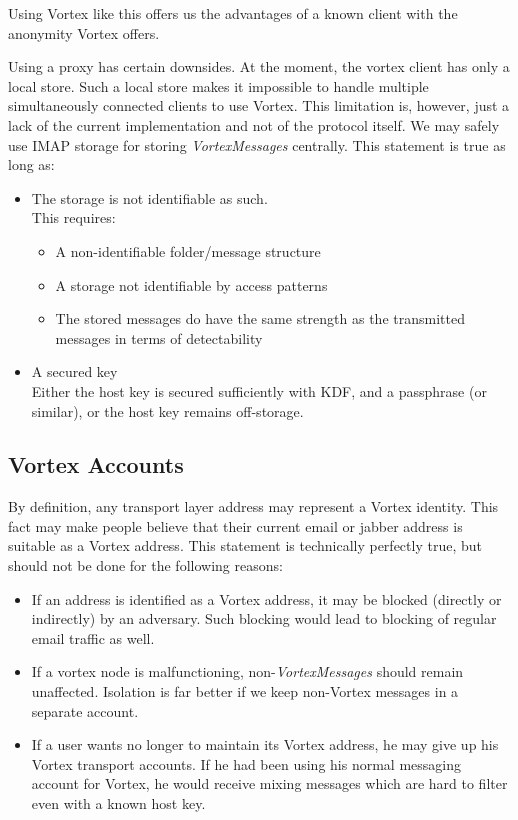 Using Vortex like this offers us the advantages of a known client with the anonymity Vortex offers.

Using a proxy has certain downsides. At the moment, the vortex client has only a local store. Such a local store makes it impossible to handle multiple simultaneously connected clients to use Vortex. This limitation is, however, just a lack of the current implementation and not of the protocol itself. We may safely use IMAP storage for storing \emph{VortexMessages} centrally. This statement is true as long as:
\begin{itemize}
	\item The storage is not identifiable as such.\\
	This requires:
	\begin{itemize}
		\item A non-identifiable folder/message structure
		\item A storage not identifiable by access patterns
		\item The stored messages do have the same strength as the transmitted messages in terms of detectability
	\end{itemize}
	\item A secured key\\
	Either the host key is secured sufficiently with KDF, and a passphrase (or similar), or the host key remains off-storage.
\end{itemize}

\subsection{Vortex Accounts}
By definition, any transport layer address may represent a Vortex identity. This fact may make people believe that their current email or jabber address is suitable as a Vortex address. This statement is technically perfectly true, but should not be done for the following reasons:
\begin{itemize}
	\item If an address is identified as a Vortex address, it may be blocked (directly or indirectly) by an adversary. Such blocking would lead to blocking of regular email traffic as well.
	\item If a vortex node is malfunctioning, non-\emph{VortexMessages} should remain unaffected. Isolation is far better if we keep non-Vortex messages in a separate account.
	\item If a user wants no longer to maintain its Vortex address, he may give up his Vortex transport accounts. If he had been using his normal messaging account for Vortex, he would receive mixing messages which are hard to filter even with a known host key.
\end{itemize}

